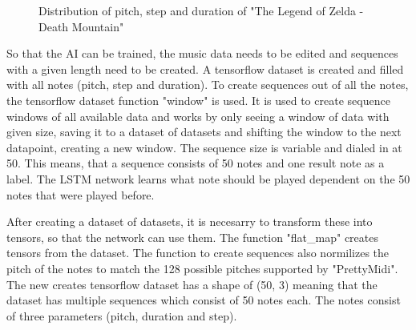 \begin{figure}

\caption{Distribution of pitch, step and duration of "The Legend of Zelda - Death Mountain"}
\label{fig:verteilung}   
\end{figure}

So that the AI can be trained, the music data needs to be edited and sequences with a given 
length need to be created. A tensorflow dataset is created and filled with all notes (pitch, step and duration).
To create sequences out of all the notes, the tensorflow dataset function "window" is used. It is used to 
create sequence windows of all available data and works by only seeing a window of data with given size, saving
it to a dataset of datasets and shifting the window to the next datapoint, creating a new window.
The sequence size is variable and dialed in at 50. This means, that a sequence consists of 50 notes and 
one result note as a label. The LSTM network learns what note should be played dependent on the 50 notes that were
played before.


After creating a dataset of datasets, it is necesarry to transform these into tensors, so that the network can
use them. The function "flat\_map" creates tensors from the dataset. The function to create sequences also normilizes 
the pitch of the notes to match the 128 possible pitches supported by "PrettyMidi". The new creates tensorflow dataset
has a shape of (50, 3) meaning that the dataset has multiple sequences which consist of 50 notes each. The notes consist
of three parameters (pitch, duration and step).

